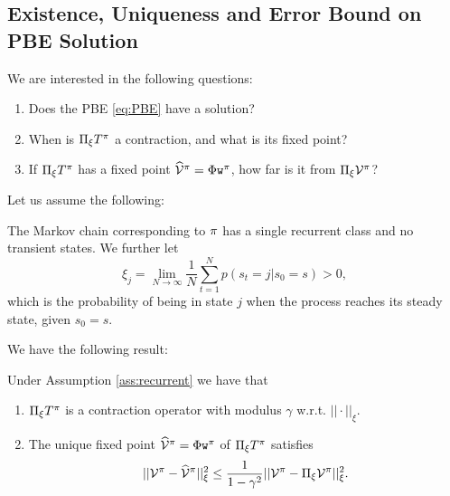 \subsection{Existence, Uniqueness and Error Bound on PBE Solution}
We are interested in the following questions:
\begin{enumerate}
\item Does the PBE \eqref{eq:PBE} have a solution?
\item When is $\Pi_\xi T^\pi$ a contraction, and what is its fixed point?
\item If $\Pi_\xi T^\pi$ has a fixed point $\widehat{\mathcal{V}}^{\pi} = \Phi\texttt{w}^{\pi}$, how far is it from $\Pi_\xi \mathcal{V}^\pi$?
\end{enumerate}
Let us assume the following:
\begin{assumption}\label{ass:recurrent}The Markov chain corresponding to $\pi$ has a single recurrent class and no transient states. We further let
$$\xi_j = \lim_{N\rightarrow \infty} \frac{1}{N} \sum_{t=1}^N p(s_t=j|s_0=s)>0,$$
which is the probability of being in state $j$ when the process reaches its steady state, given $s_0=s$.
\end{assumption}
We have the following result:
\begin{proposition}\label{prop:PBE_contraction} Under Assumption \ref{ass:recurrent} we have that
\begin{enumerate}
\item $\Pi_\xi T^\pi$ is a contraction operator with modulus $\gamma$ w.r.t. $||\cdot||_\xi$.
\item The unique fixed point $\widehat{\mathcal{V}}^{\pi} = \Phi \texttt{w}^{\pi}$ of $\Pi_\xi T^\pi$ satisfies
$$||\mathcal{V}^\pi - \widehat{\mathcal{V}}^{\pi}||_\xi^2 \le \frac{1}{1-\gamma^2}||\mathcal{V}^\pi-\Pi_\xi \mathcal{V}^\pi||_\xi^2.$$
\end{enumerate}
\end{proposition}
